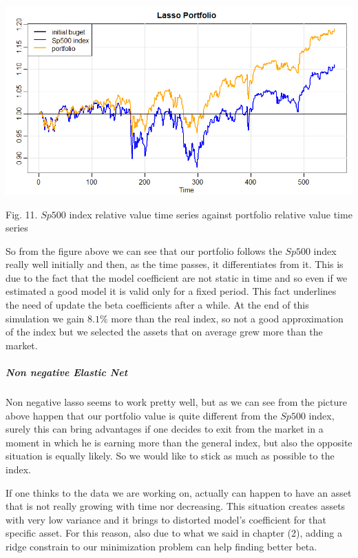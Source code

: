 \documentclass{article}%
\begin{document}
\includegraphics[scale=0.55]{lassoportfolio}
\begin{center}
\begin{small}
Fig. 11. $Sp500$ index relative value time series against portfolio relative value time series
\\

\end{small}
\end{center}


So from the figure above we can see that our portfolio follows the $Sp500$ index really well initially and then, as the time passes, it differentiates from it. This is due to the fact that the model coefficient are not static in time and so even if we estimated a good model it is valid only for a fixed period. This fact underlines the need of update the beta coefficients after a while. At the end of this simulation we gain $8.1\%$ more than the real index, so not a good approximation of the index but we selected the assets that on average grew more than the market.

\subparagraph{Non negative Elastic Net}
Non negative lasso seems to work pretty well, but as we can see from the picture above happen that our portfolio value is quite different from the $Sp500$ index, surely this can bring advantages if one decides to exit from the market in a moment in which he is earning more than the general index, but also the opposite situation is equally likely. So we would like to stick as much as possible to the index.

If one thinks to the data we are working on, actually can happen to have an asset that is not really growing with time nor decreasing. This situation creates assets with very low variance and it brings to distorted model's coefficient for that specific asset. For this reason, also due to what we said in chapter (2), adding a ridge constrain to our minimization problem can help finding better beta.
\end{document}
